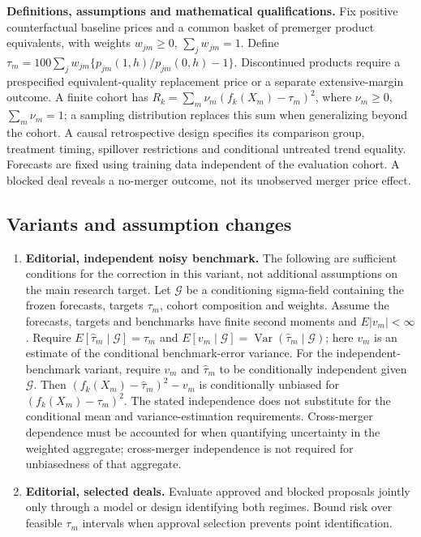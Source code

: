\documentclass[11pt,a4paper]{article}
\newcommand{\Var}{\operatorname{Var}}
\begin{document}
\textbf{Definitions, assumptions and mathematical qualifications.} Fix positive counterfactual baseline prices and a common basket of premerger product equivalents, with weights \(w_{jm}\geq0\), \(\sum_jw_{jm}=1\). Define \(\tau_m=100\sum_jw_{jm}\{p_{jm}(1,h)/p_{jm}(0,h)-1\}\). Discontinued products require a prespecified equivalent-quality replacement price or a separate extensive-margin outcome. A finite cohort has \(R_k=\sum_m\nu_m(f_k(X_m)-\tau_m)^2\), where \(\nu_m\geq0\), \(\sum_m\nu_m=1\); a sampling distribution replaces this sum when generalizing beyond the cohort. A causal retrospective design specifies its comparison group, treatment timing, spillover restrictions and conditional untreated trend equality. Forecasts are fixed using training data independent of the evaluation cohort. A blocked deal reveals a no-merger outcome, not its unobserved merger price effect.
\subsection*{Variants and assumption changes}
\begin{enumerate}
\item \textbf{Editorial, independent noisy benchmark.} The following are sufficient conditions for the correction in this variant, not additional assumptions on the main research target. Let \(\mathcal G\) be a conditioning sigma-field containing the frozen forecasts, targets \(\tau_m\), cohort composition and weights. Assume the forecasts, targets and benchmarks have finite second moments and \(E|v_m|<\infty\). Require \(E[\widehat\tau_m\mid\mathcal G]=\tau_m\) and \(E[v_m\mid\mathcal G]=\Var(\widehat\tau_m\mid\mathcal G)\); here \(v_m\) is an estimate of the conditional benchmark-error variance. For the independent-benchmark variant, require \(v_m\) and \(\widehat\tau_m\) to be conditionally independent given \(\mathcal G\). Then \((f_k(X_m)-\widehat\tau_m)^2-v_m\) is conditionally unbiased for \((f_k(X_m)-\tau_m)^2\). The stated independence does not substitute for the conditional mean and variance-estimation requirements. Cross-merger dependence must be accounted for when quantifying uncertainty in the weighted aggregate; cross-merger independence is not required for unbiasedness of that aggregate.
\item \textbf{Editorial, selected deals.} Evaluate approved and blocked proposals jointly only through a model or design identifying both regimes. Bound risk over feasible \(\tau_m\) intervals when approval selection prevents point identification.
\end{enumerate}
\end{document}
